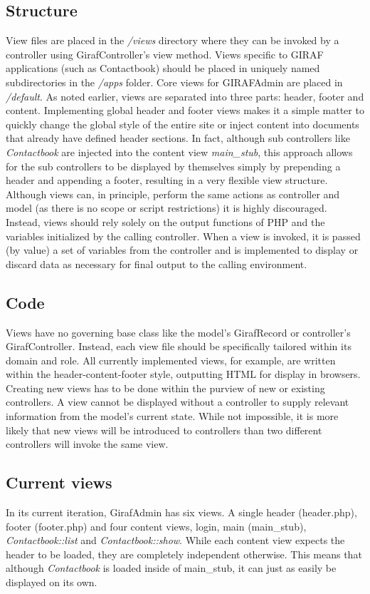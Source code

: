 \subsection{Structure}
View files are placed in the \emph{/views} directory where they can be invoked by a controller using GirafController's view method. Views specific to GIRAF applications (such as Contactbook) should be placed in uniquely named subdirectories in the \emph{/apps} folder. Core views for GIRAFAdmin are placed in \emph{/default}.
As noted earlier, views are separated into three parts: header, footer and content. Implementing global header and footer views makes it a simple matter to quickly change the global style of the entire site or inject content into documents that already have defined header sections. In fact, although sub controllers like \emph{Contactbook} are injected into the content view \emph{main\_stub}, this approach allows for the sub controllers to be displayed by themselves simply by prepending a header and appending a footer, resulting in a very flexible view structure.
Although views can, in principle, perform the same actions as controller and model (as there is no scope or script restrictions) it is highly discouraged. Instead, views should rely solely on the output functions of PHP and the variables initialized by the calling controller. When a view is invoked, it is passed (by value) a set of variables from the controller and is implemented to display or discard data as necessary for final output to the calling environment.

\subsection{Code}
Views have no governing base class like the model's GirafRecord or controller's GirafController. Instead, each view file should be specifically tailored within its domain and role. All currently implemented views, for example, are written within the header-content-footer style, outputting HTML for display in browsers.
Creating new views has to be done within the purview of new or existing controllers. A view cannot be displayed without a controller to supply relevant information from the model's current state. While not impossible, it is more likely that new views will be introduced to controllers than two different controllers will invoke the same view.

\subsection{Current views}
In its current iteration, GirafAdmin has six views. A single header (header.php), footer (footer.php) and four content views, login, main (main\_stub), \emph{Contactbook::list} and \emph{Contactbook::show}. While each content view expects the header to be loaded, they are completely independent otherwise. This means that although \emph{Contactbook} is loaded inside of main\_stub, it can just as easily be displayed on its own.
